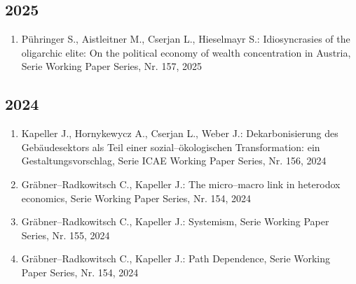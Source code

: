 \subsection*{2025}
\begin{enumerate}
    	 \item Pühringer S., Aistleitner M., Cserjan L., Hieselmayr S.: Idiosyncrasies of the oligarchic elite: On the political economy of wealth concentration in Austria, Serie Working Paper Series, Nr. 157, 2025
\end{enumerate}
\subsection*{2024}
\begin{enumerate}
    	 \item Kapeller J., Hornykewycz A., Cserjan L., Weber J.: Dekarbonisierung des Gebäudesektors als Teil einer sozial--ökologischen Transformation: ein Gestaltungsvorschlag, Serie ICAE Working Paper Series, Nr. 156, 2024
	 \item Gräbner--Radkowitsch C., Kapeller J.: The micro--macro link in heterodox economics, Serie Working Paper Series, Nr. 154, 2024
	 \item Gräbner--Radkowitsch C., Kapeller J.: Systemism, Serie Working Paper Series, Nr. 155, 2024
	 \item Gräbner--Radkowitsch C., Kapeller J.: Path Dependence, Serie Working Paper Series, Nr. 154, 2024
\end{enumerate}
